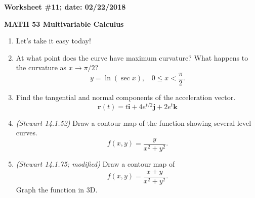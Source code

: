 \documentclass{article}
\newcommand{\ii}{\mathbf{i}}
\newcommand{\jj}{\mathbf{j}}
\newcommand{\kk}{\mathbf{k}}
\newcommand{\rr}{\mathbf{r}}
\begin{document}
{\bf Worksheet \#11; date: 02/22/2018}

{\bf MATH 53 Multivariable Calculus}

\begin{enumerate}
\item Let's take it easy today!

\item At what point does the curve have maximum curvature? What happens to the curvature as $x \to \pi / 2$?
\[
y = \ln (\sec x), ~~~~ 0 \le x < \frac{\pi}{2}.
\]

\item Find the tangential and normal components of the acceleration vector.
\[
\rr(t) = t \ii + 4e^{t/2} \jj + 2e^t \kk
\]

\item {\em (Stewart 14.1.52)} Draw a contour map of the function showing several level curves.
\[
f(x, y) = \frac{y}{x^2 + y^2}.
\]

\item {\em (Stewart 14.1.75; modified)} Draw a contour map of
\[
f(x, y) = \frac{x + y}{x^2 + y^2}.
\]
Graph the function in 3D.
\end{enumerate}
\end{document}
